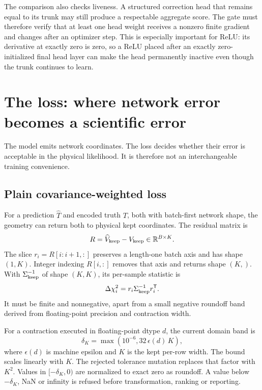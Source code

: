 \documentclass[10pt,aps,prd,twocolumn,nofootinbib]{revtex4-2}
\begin{document}
The comparison also checks liveness.  A structured correction head that
remains equal to its trunk may still produce a respectable aggregate score.
The gate must therefore verify that at least one head weight receives a
nonzero finite gradient and changes after an optimizer step.  This is
especially important for ReLU: its derivative at exactly zero is zero, so a
ReLU placed after an exactly zero-initialized final head layer can make the
head permanently inactive even though the trunk continues to learn.

\section{The loss: where network error becomes a scientific error}
\label{chap:loss}

The model emits network coordinates.  The loss decides whether their error is
acceptable in the physical likelihood.  It is therefore not an interchangeable
training convenience.

\subsection{Plain covariance-weighted loss}

For a prediction $\widehat T$ and encoded truth $T$, both with batch-first
network shape, the geometry can return both to physical kept coordinates.
The residual matrix is
\begin{equation}
  R = \widehat V_{\rm keep}-V_{\rm keep}
  \in\mathbb R^{B\times K}.
\end{equation}
The slice $r_i=R[i:i+1,:]$ preserves a length-one batch axis and has shape
$(1,K)$.  Integer indexing $R[i,:]$ removes that axis and returns shape
$(K,)$.  With
$\Sigma_{\rm keep}^{-1}$ of shape $(K,K)$, its per-sample statistic is
\begin{equation}
  \Delta\chi_i^2=r_i\Sigma_{\rm keep}^{-1}r_i^{\mathsf T}.
  \label{eq:dchi2}
\end{equation}
It must be finite and nonnegative, apart from a small negative roundoff band
derived from floating-point precision and contraction width.

For a contraction executed in floating-point dtype $d$, the current domain
band is
\begin{equation*}
 \delta_K=\max\!\left(10^{-6},32\,\epsilon(d)\,K\right),
\end{equation*}
where $\epsilon(d)$ is machine epsilon and $K$ is the kept per-row width.  The
bound scales linearly with $K$.  The rejected tolerance mutation replaces that
factor with $K^2$.  Values in $[-\delta_K,0)$ are normalized to exact zero as roundoff.
A value below $-\delta_K$, NaN or infinity is refused before transformation,
ranking or reporting.
\end{document}
